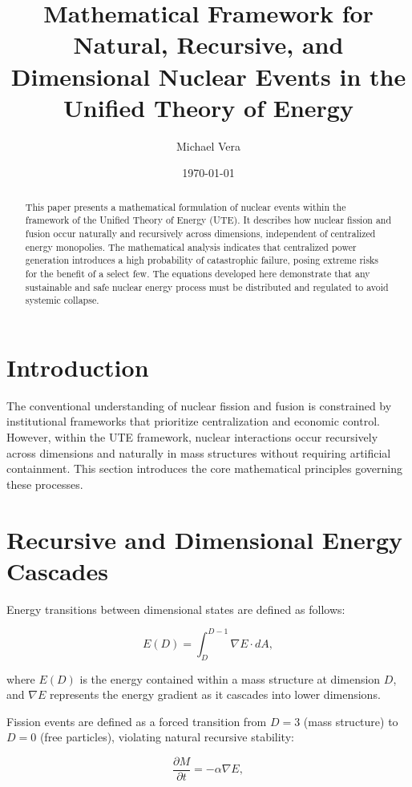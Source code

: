 \documentclass[letterpaper,12pt]{article}
\title{Mathematical Framework for Natural, Recursive, and Dimensional Nuclear Events in the Unified Theory of Energy}
\author{Michael Vera}
\date{\today}
\begin{document}
\maketitle

\begin{abstract}
This paper presents a mathematical formulation of nuclear events within the framework of the Unified Theory of Energy (UTE). It describes how nuclear fission and fusion occur naturally and recursively across dimensions, independent of centralized energy monopolies. The mathematical analysis indicates that centralized power generation introduces a high probability of catastrophic failure, posing extreme risks for the benefit of a select few. The equations developed here demonstrate that any sustainable and safe nuclear energy process must be distributed and regulated to avoid systemic collapse.
\end{abstract}

\section{Introduction}
The conventional understanding of nuclear fission and fusion is constrained by institutional frameworks that prioritize centralization and economic control. However, within the UTE framework, nuclear interactions occur recursively across dimensions and naturally in mass structures without requiring artificial containment. This section introduces the core mathematical principles governing these processes.

\section{Recursive and Dimensional Energy Cascades}
Energy transitions between dimensional states are defined as follows:

\begin{equation}
    E(D) = \int_{D}^{D-1} \nabla E \cdot dA,
\end{equation}

where $E(D)$ is the energy contained within a mass structure at dimension $D$, and $\nabla E$ represents the energy gradient as it cascades into lower dimensions. 

Fission events are defined as a forced transition from $D=3$ (mass structure) to $D=0$ (free particles), violating natural recursive stability:

\begin{equation}
    \frac{\partial M}{\partial t} = -\alpha \nabla E,
\end{equation}
\end{document}
